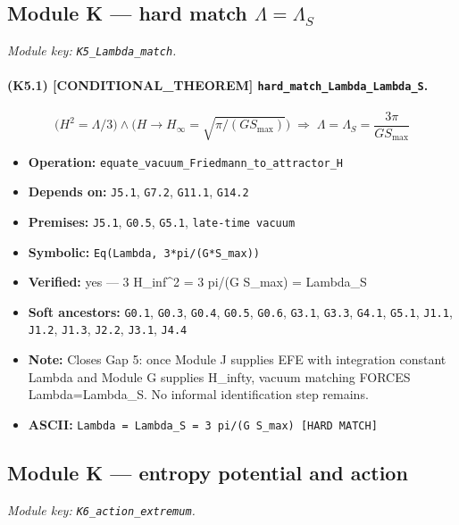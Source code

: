 \documentclass[11pt,a4paper]{article}
\theoremstyle{remark}\newtheorem*{caution}{Caution}
\newcommand{\tagbox}[1]{\textsc{[#1]}}
\begin{document}
\subsection{Module K --- hard match $\Lambda=\Lambda_S$}
\textit{Module key: \texttt{K5\_Lambda\_match}.}
\paragraph{(K5.1) \tagbox{CONDITIONAL\_THEOREM} \texttt{hard\_match\_Lambda\_Lambda\_S}.}
\begin{equation}
\bigl(H^2=\Lambda/3\bigr)\wedge\bigl(H\to H_\infty=\sqrt{\pi/(GS_{\max})}\bigr)\;\Rightarrow\;\Lambda=\Lambda_S=\dfrac{3\pi}{GS_{\max}}
\tag{K5.1}
\end{equation}
\begin{itemize}\setlength{\itemsep}{0.12em}
\item \textbf{Operation:} \texttt{equate\_vacuum\_Friedmann\_to\_attractor\_H}
\item \textbf{Depends on:} \texttt{J5.1}, \texttt{G7.2}, \texttt{G11.1}, \texttt{G14.2}
\item \textbf{Premises:} \texttt{J5.1}, \texttt{G0.5}, \texttt{G5.1}, \texttt{late-time vacuum}
\item \textbf{Symbolic:} \texttt{Eq(Lambda, 3*pi/(G*S\_max))}
\item \textbf{Verified:} yes --- 3 H\_inf^2 = 3 pi/(G S\_max) = Lambda\_S
\item \textbf{Soft ancestors:} \texttt{G0.1}, \texttt{G0.3}, \texttt{G0.4}, \texttt{G0.5}, \texttt{G0.6}, \texttt{G3.1}, \texttt{G3.3}, \texttt{G4.1}, \texttt{G5.1}, \texttt{J1.1}, \texttt{J1.2}, \texttt{J1.3}, \texttt{J2.2}, \texttt{J3.1}, \texttt{J4.4}
\item \textbf{Note:} Closes Gap 5: once Module J supplies EFE with integration constant Lambda and Module G supplies H\_infty, vacuum matching FORCES Lambda=Lambda\_S. No informal identification step remains.
\item \textbf{ASCII:} \texttt{Lambda = Lambda\_S = 3 pi/(G S\_max)  [HARD MATCH]}
\end{itemize}
\subsection{Module K --- entropy potential and action}
\textit{Module key: \texttt{K6\_action\_extremum}.}
\end{document}
